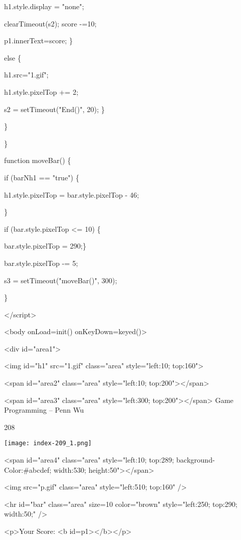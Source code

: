 \documentclass[
]{article}
\begin{document}
h1.style.display = "none";

clearTimeout(s2); score -=10;

p1.innerText=score; \}

else \{

h1.src="1.gif";

h1.style.pixelTop += 2;

s2 = setTimeout("End()", 20); \}

\}

\}

function moveBar() \{

if (barNh1 == "true") \{

h1.style.pixelTop = bar.style.pixelTop - 46;

\}

if (bar.style.pixelTop \textless= 10) \{

bar.style.pixelTop = 290;\}

bar.style.pixelTop -= 5;

s3 = setTimeout("moveBar()", 300);

\}

\textless/script\textgreater{}

\textless body onLoad=init() onKeyDown=keyed()\textgreater{}

\textless div id="area1"\textgreater{}

\textless img id="h1" src="1.gif" class="area" style="left:10;
top:160"\textgreater{}

\textless span id="area2" class="area" style="left:10;
top:200"\textgreater\textless/span\textgreater{}

\textless span id="area3" class="area" style="left:300;
top:200"\textgreater\textless/span\textgreater{} Game Programming --
Penn Wu

208

\protect\hypertarget{index_split_011.htmlux5cux23p209}{}{}\texttt{[image: index-209\_1.png]}

\textless span id="area4" class="area" style="left:10; top:289;
background-Color:\#abcdef; width:530;
height:50"\textgreater\textless/span\textgreater{}

\textless img src="p.gif" class="area" style="left:510; top:160"
/\textgreater{}

\textless hr id="bar" class="area" size=10 color="brown"
style="left:250; top:290; width:50;" /\textgreater{}

\textless p\textgreater Your Score: \textless b
id=p1\textgreater\textless/b\textgreater\textless/p\textgreater{}
\end{document}
